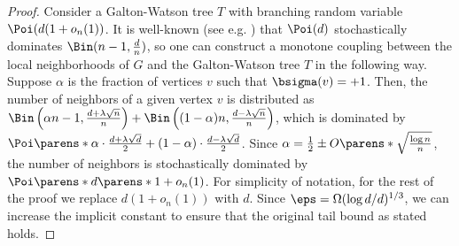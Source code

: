 \documentclass[11pt,letterpaper]{article}
\begin{document}
\begin{proof}
    Consider a Galton-Watson tree $T$ with branching random variable $\Poi(d(1+o_n(1))$. It is well-known (see e.g. \cite[Example 4.2.8]{Roch24}) that $\Poi(d)$ stochastically dominates $\Bin(n-1, \frac{d}{n})$, so one can construct a monotone coupling between the local neighborhoods of $G$ and the Galton-Watson tree $T$ in the following way.
    Suppose $\alpha$ is the fraction of vertices $v$ such that $\bsigma(v) = +1$.
    Then, the number of neighbors of a given vertex $v$ is distributed as $\Bin\left(\alpha n - 1, \frac{d+\lambda\sqrt{n}}{n}\right) + \Bin\left((1-\alpha)n, \frac{d-\lambda\sqrt{n}}{n} \right)$, which is dominated by $\Poi\parens*{\alpha\cdot\frac{d+\lambda \sqrt{d}}{2} + (1-\alpha)\cdot\frac{d-\lambda\sqrt{d}}{2}}$.
    Since $\alpha = \frac{1}{2}\pm O\parens*{\sqrt{\frac{\log n}{n}}}$, the number of neighbors is stochastically dominated by $\Poi\parens*{d\parens*{1 + o_n(1)}}$. 
    For simplicity of notation, for the rest of the proof we replace $d(1+o_n(1))$ with $d$. 
    Since $\eps = \Omega(\log d/d)^{1/3}$, we can increase the implicit constant to ensure that the original tail bound as stated holds.


\end{proof}
\end{document}
